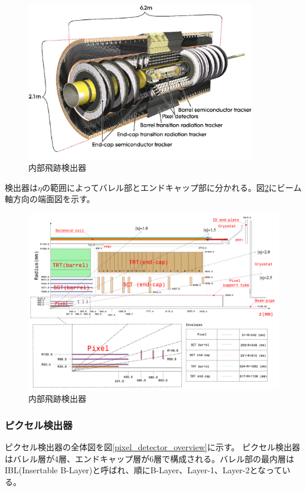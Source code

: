 \begin{figure}[bpt]\centering
\includegraphics[width=10cm]{inner_detector}
\caption[内部飛跡検出器]{内部飛跡検出器\cite{1-2}}
\label{inner_detector}
\end{figure}


検出器は$\eta$の範囲によってバレル部とエンドキャップ部に分かれる。図\ref{inner_cross_section}にビーム軸方向の端面図を示す。

\begin{figure}[bpt]\centering
\includegraphics[width=12cm]{inner_cross_section}
\caption[内部飛跡検出器]{内部飛跡検出器\cite{1-4}}
\label{inner_cross_section}
\end{figure}

\subsubsection{ピクセル検出器}

ピクセル検出器の全体図を図\ref{pixel_detector_overview}に示す。
ピクセル検出器はバレル層が4層、エンドキャップ層が6層で構成される。バレル部の最内層はIBL(Insertable B-Layer)と呼ばれ、順にB-Layer、Layer-1、Layer-2となっている。

